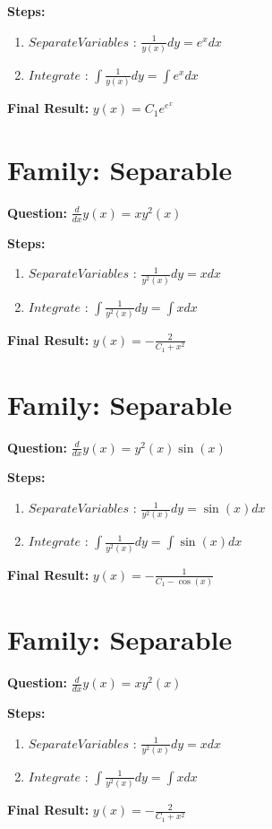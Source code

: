 \documentclass{article}
\begin{document}
\textbf{Steps:}
\begin{enumerate}
\item $Separate Variables$ :  $\frac{1}{y{\left(x \right)}} dy = e^{x} dx$
\item $Integrate$ :  $\int \frac{1}{y{\left(x \right)}} dy = \int e^{x} dx$
\end{enumerate}
\textbf{Final Result:} $y{\left(x \right)} = C_{1} e^{e^{x}}$

\section*{Family: Separable}
\textbf{Question:} $\frac{d}{d x} y{\left(x \right)} = x y^{2}{\left(x \right)}$

\textbf{Steps:}
\begin{enumerate}
\item $Separate Variables$ :  $\frac{1}{y^{2}{\left(x \right)}} dy = x dx$
\item $Integrate$ :  $\int \frac{1}{y^{2}{\left(x \right)}} dy = \int x dx$
\end{enumerate}
\textbf{Final Result:} $y{\left(x \right)} = - \frac{2}{C_{1} + x^{2}}$

\section*{Family: Separable}
\textbf{Question:} $\frac{d}{d x} y{\left(x \right)} = y^{2}{\left(x \right)} \sin{\left(x \right)}$

\textbf{Steps:}
\begin{enumerate}
\item $Separate Variables$ :  $\frac{1}{y^{2}{\left(x \right)}} dy = \sin{\left(x \right)} dx$
\item $Integrate$ :  $\int \frac{1}{y^{2}{\left(x \right)}} dy = \int \sin{\left(x \right)} dx$
\end{enumerate}
\textbf{Final Result:} $y{\left(x \right)} = - \frac{1}{C_{1} - \cos{\left(x \right)}}$

\section*{Family: Separable}
\textbf{Question:} $\frac{d}{d x} y{\left(x \right)} = x y^{2}{\left(x \right)}$

\textbf{Steps:}
\begin{enumerate}
\item $Separate Variables$ :  $\frac{1}{y^{2}{\left(x \right)}} dy = x dx$
\item $Integrate$ :  $\int \frac{1}{y^{2}{\left(x \right)}} dy = \int x dx$
\end{enumerate}
\textbf{Final Result:} $y{\left(x \right)} = - \frac{2}{C_{1} + x^{2}}$
\end{document}
